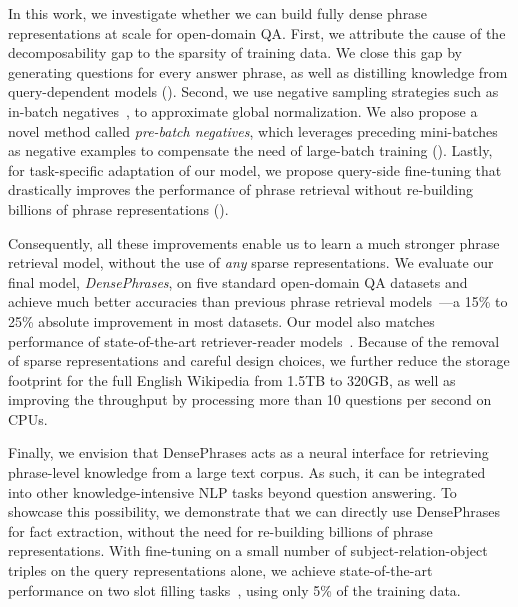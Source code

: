 \documentclass[11pt,a4paper]{article}
\newcommand\ti[1]{\textit{#1}}
\begin{document}
 
In this work, we investigate whether we can build fully dense phrase representations at scale for open-domain QA.
First, we attribute the cause of the decomposability gap to the sparsity of training data.
We close this gap by generating questions for every answer phrase, as well as distilling knowledge from query-dependent models (). {Second}, we use negative sampling strategies such as in-batch negatives~\citep{henderson2017efficient,karpukhin2020dense}, to approximate global normalization.
We also propose a novel method called \ti{pre-batch negatives}, which leverages preceding mini-batches as negative examples to compensate the need of large-batch training (). Lastly, for task-specific adaptation of our model, we propose query-side fine-tuning that drastically improves the performance of phrase retrieval without re-building billions of phrase representations ().












Consequently, all these improvements enable us to learn a much stronger phrase retrieval model, without the use of \ti{any} sparse representations. We evaluate our final model, \ti{DensePhrases}, on five standard open-domain QA datasets and achieve much better accuracies than previous phrase retrieval models~\citep{seo2019real,lee2020contextualized}---a 15\% to 25\% absolute improvement in most datasets. Our model also matches performance of state-of-the-art retriever-reader models~\citep{guu2020realm,karpukhin2020dense}.
Because of the removal of sparse representations and careful design choices,  we further reduce the storage footprint for the full English Wikipedia from 1.5TB to 320GB, as well as improving the throughput by processing more than 10 questions per second on CPUs.







Finally, we envision that DensePhrases acts as a neural interface for retrieving phrase-level knowledge from a large text corpus. As such, it can be integrated into other knowledge-intensive NLP tasks beyond question answering.
To showcase this possibility, we demonstrate that we can directly use DensePhrases for fact extraction, without the need for re-building billions of phrase representations.
With fine-tuning on a small number of subject-relation-object triples on the query representations alone, we achieve state-of-the-art performance on two slot filling tasks~\citep{petroni2020kilt}, using only 5\% of the training data.
\end{document}
